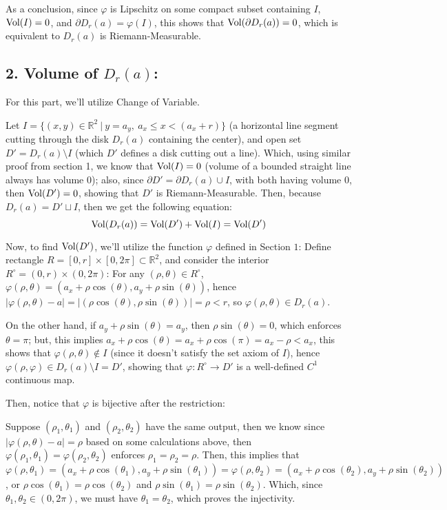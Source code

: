 \documentclass{article}
\begin{document}
As a conclusion, since $\varphi$ is Lipschitz on some compact subset containing $I$, $\textmd{Vol}(I)=0$, and $\partial D_r(a)=\varphi(I)$, this shows that $\textmd{Vol}(\partial D_r(a)) = 0$, which is equivalent to $D_r(a)$ is Riemann-Measurable.

\subsection*{2. Volume of $D_r(a)$:}
For this part, we'll utilize Change of Variable. 

Let $I=\{(x,y)\in\mathbb{R}^2\ |\ y=a_y,\ a_x\leq x < (a_x+r)\}$ (a horizontal line segment cutting through the disk $D_r(a)$ containing the center), and open set $D' = D_r(a)\setminus I$ (which $D'$ defines a disk cutting out a line). Which, using similar proof from section 1, we know that $\textmd{Vol}(I) = 0$ (volume of a bounded straight line always has volume $0$); also, since $\partial D' = \partial D_r(a)\cup I$, with both having volume $0$, then $\textmd{Vol}(D') = 0$, showing that $D'$ is Riemann-Measurable.
Then, because $D_r(a)= D' \sqcup I$, then we get the following equation: 
\begin{equation}
    \textmd{Vol}(D_r(a))=\textmd{Vol}(D') + \textmd{Vol}(I) = \textmd{Vol}(D')
\end{equation}

\hfil

Now, to find $\textmd{Vol}(D')$, we'll utilize the function $\varphi$ defined in Section $1$: Define rectangle $R=[0,r]\times [0,2\pi]\subset\mathbb{R}^2$, and consider the interior $R^\circ = (0,r)\times (0,2\pi)$: For any $(\rho,\theta)\in R^\circ$, $\varphi(\rho,\theta)=(a_x+\rho\cos(\theta),a_y+\rho\sin(\theta))$, hence $|\varphi(\rho,\theta)-a| = |(\rho\cos(\theta),\rho\sin(\theta))| = \rho <r$, so $\varphi(\rho,\theta)\in D_r(a)$.

On the other hand, if $a_y+\rho\sin(\theta) = a_y$, then $\rho\sin(\theta) = 0$, which enforces $\theta = \pi$; but, this implies $a_x+\rho\cos(\theta) = a_x+\rho\cos(\pi) = a_x-\rho<a_x$, this shows that $\varphi(\rho,\theta)\notin I$ (since it doesn't satisfy the set axiom of $I$), hence $\varphi(\rho,\varphi)\in D_r(a)\setminus I = D'$, showing that $\varphi:R^\circ\rightarrow D'$ is a well-defined $C^1$ continuous map.

\hfil

Then, notice that $\varphi$ is bijective after the restriction: 

Suppose $(\rho_1,\theta_1)$ and $(\rho_2,\theta_2)$ have the same output, then we know since $|\varphi(\rho,\theta)-a| = \rho$ based on some calculations above, then $\varphi(\rho_1,\theta_1)=\varphi(\rho_2,\theta_2)$ enforces $\rho_1 = \rho_2 = \rho$. Then, this implies that $\varphi(\rho,\theta_1) = (a_x+\rho\cos(\theta_1),a_y+\rho\sin(\theta_1))=\varphi(\rho,\theta_2)=(a_x+\rho\cos(\theta_2),a_y+\rho\sin(\theta_2))$, or $\rho\cos(\theta_1)=\rho\cos(\theta_2)$ and $\rho\sin(\theta_1)=\rho\sin(\theta_2)$. Which, since $\theta_1,\theta_2\in (0,2\pi)$, we must have $\theta_1=\theta_2$, which proves the injectivity.
\end{document}
